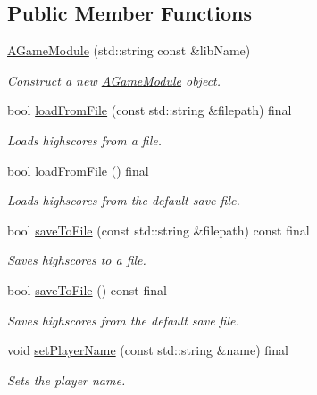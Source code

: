 \subsection*{Public Member Functions}
\begin{DoxyCompactItemize}
\item 
\mbox{\hyperlink{classArcade_1_1Games_1_1AGameModule_a0f8d2149171d7eacf1d16a84fb0d9aa2}{A\+Game\+Module}} (std\+::string const \&lib\+Name)
\begin{DoxyCompactList}\small\item\em Construct a new \mbox{\hyperlink{classArcade_1_1Games_1_1AGameModule}{A\+Game\+Module}} object. \end{DoxyCompactList}\item 
bool \mbox{\hyperlink{classArcade_1_1Games_1_1AGameModule_a1f7e26d79d4c392458407edfe934ff5f}{load\+From\+File}} (const std\+::string \&filepath) final
\begin{DoxyCompactList}\small\item\em Loads highscores from a file. \end{DoxyCompactList}\item 
bool \mbox{\hyperlink{classArcade_1_1Games_1_1AGameModule_a61be4a5123cb5933b10fa0a4c34d8b06}{load\+From\+File}} () final
\begin{DoxyCompactList}\small\item\em Loads highscores from the default save file. \end{DoxyCompactList}\item 
bool \mbox{\hyperlink{classArcade_1_1Games_1_1AGameModule_a16425d9ca7518acbc60fbece4a974009}{save\+To\+File}} (const std\+::string \&filepath) const final
\begin{DoxyCompactList}\small\item\em Saves highscores to a file. \end{DoxyCompactList}\item 
bool \mbox{\hyperlink{classArcade_1_1Games_1_1AGameModule_a82fdd06480edd7f727504f5073730812}{save\+To\+File}} () const final
\begin{DoxyCompactList}\small\item\em Saves highscores from the default save file. \end{DoxyCompactList}\item 
void \mbox{\hyperlink{classArcade_1_1Games_1_1AGameModule_abdbf4cf008033b5f339d9758d7f2b8a2}{set\+Player\+Name}} (const std\+::string \&name) final
\begin{DoxyCompactList}\small\item\em Sets the player name. \end{DoxyCompactList}\item 

\end{DoxyCompactItemize}
